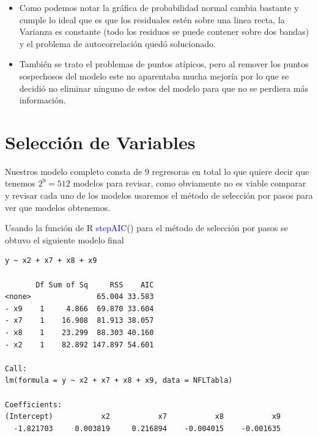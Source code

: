 \documentclass[11pt]{beamer}
\begin{document}
\begin{frame}
\begin{itemize}
\justifying
\item[\textcolor{red}{\textbullet}] Como podemos notar la gráfica de probabilidad normal cambia bastante y cumple lo ideal que es que los residuales estén sobre una linea recta, la Varianza es constante (todo los residuos se puede contener sobre dos bandas) y el problema de autocorrelación quedó solucionado.

\item[\textcolor{red}{\textbullet}] También se trato el problemas de puntos atípicos, pero al remover los puntos sospechosos del modelo este no aparentaba mucha mejoría por lo que se decidió no eliminar ninguno de estos del modelo para que no se perdiera más información.
\end{itemize}
\end{frame}


\section{Selección de Variables}

\begin{frame}{}
\tableofcontents[currentsection]
\end{frame}

\begin{frame}
Nuestros modelo completo consta de 9 regresoras en total lo que quiere decir que tenemos $2^{9}=512$ modelos para revisar, como obviamente no es viable comparar y revisar cada uno de los modelos usaremos el método de selección por pasos para ver que modelos obtenemos.
\end{frame}

\begin{frame}[fragile]
Usando la función de R \textcolor{blue}{stepAIC()} para el método de selección por pasos se obtuvo el siguiente modelo final

\begin{lstlisting}[basicstyle=\tiny]
y ~ x2 + x7 + x8 + x9

       Df Sum of Sq     RSS    AIC
<none>               65.004 33.583
- x9    1     4.866  69.870 33.604
- x7    1    16.908  81.913 38.057
- x8    1    23.299  88.303 40.160
- x2    1    82.892 147.897 54.601

Call:
lm(formula = y ~ x2 + x7 + x8 + x9, data = NFLTabla)

Coefficients:
(Intercept)           x2           x7           x8           x9  
  -1.821703     0.003819     0.216894    -0.004015    -0.001635  
\end{lstlisting}
\end{frame}
\end{document}
